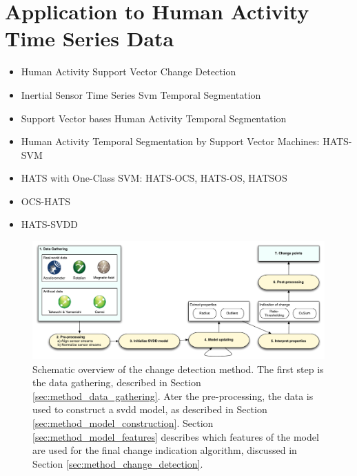 
\chapter{Application to Human Activity Time Series Data}

\label{Chapter4} %


\begin{itemize}
  \item Human Activity Support Vector Change Detection
  \item Inertial Sensor Time Series Svm Temporal Segmentation
  \item Support Vector bases Human Activity Temporal Segmentation
  \item Human Activity Temporal Segmentation by Support Vector Machines: HATS-SVM
  \item HATS with One-Class SVM: HATS-OCS, HATS-OS, HATSOS
  \item OCS-HATS
  \item HATS-SVDD
\end{itemize}


\begin{figure}
  \centering
    \includegraphics[width=\textwidth]{./Figures/chapter4/method_setup.pdf}
  \caption[Method setup]{Schematic overview of the change detection method. The first step is the data gathering, described in Section \ref{sec:method_data_gathering}. Ater the pre-processing, the data is used to construct a \gls{svdd} model, as described in Section \ref{sec:method_model_construction}. Section \ref{sec:method_model_features} describes which features of the model are used for the final change indication algorithm, discussed in Section \ref{sec:method_change_detection}.}
  \label{fig:method_overview}
\end{figure}

